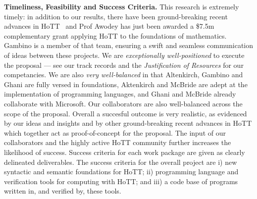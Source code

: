 \documentclass[a4paper,11pt]{article}
\begin{document}






{\bf Timeliness, Feasibility and Success Criteria.}  This research is
extremely timely: in addition to our results, there have been
ground-breaking recent advances in
HoTT~\cite{ShulmanM:uniidh,BezemM:cubsmt, nominal} and Prof Awodey has
just been awarded a \$7.5m complementary grant applying HoTT to the
foundations of mathematics. Gambino is a member of that team, ensuring
a swift and seamless communication of ideas between these projects. We
are {\em exceptionally well-positioned} to execute the proposal ---
see our track records and the {\em Justification of Resources} for our
competancies. We are also {\em very well-balanced} in that Altenkirch,
Gambino and Ghani are fully versed in foundations, Aktenkirch and
McBride are adept at the implementation of programming languages, and
Ghani and McBride already collaborate with Microsoft.
Our collaborators are also well-balanced across the scope of the
proposal. Overall a succesful outcome is very realistic, as
evidenced by our ideas and insights and by other ground-breaking
recent advances in HoTT which together act as proof-of-concept for the
proposal. The input of our collaborators and the highly active HoTT
community further increases the likelihood of success. Success criteria for each work package are given as clearly
delineated deliverables.  The success criteria for the overall project
are i) new syntactic and semantic foundations for HoTT; ii)
programming language and verification tools for computing with HoTT;
and iii) a code base of programs written in, and verified by, these
tools.

\end{document}
